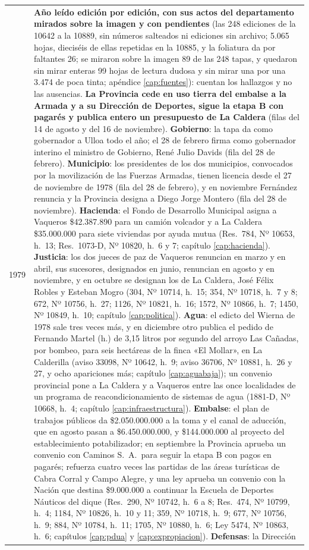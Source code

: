 \begin{longtable}{@{}p{2.7cm}p{10.3cm}@{}}
1979 & \textbf{Año leído edición por edición, con sus actos del departamento mirados sobre la imagen y con pendientes} (las 248 ediciones de la 10642 a la 10889, sin números salteados ni ediciones sin archivo; 5.065 hojas, dieciséis de ellas repetidas en la 10885, y la foliatura da por faltantes 26; se miraron sobre la imagen 89 de las 248 tapas, y quedaron sin mirar enteras 99 hojas de lectura dudosa y sin mirar una por una 3.474 de poca tinta; apéndice \ref{cap:fuentes}): cuentan los hallazgos y no las ausencias. \textbf{La Provincia cede en uso tierra del embalse a la Armada y a su Dirección de Deportes, sigue la etapa B con pagarés y publica entero un presupuesto de La Caldera} (filas del 14 de agosto y del 16 de noviembre). \textbf{Gobierno}: la tapa da como gobernador a Ulloa todo el año; el 28 de febrero firma como gobernador interino el ministro de Gobierno, René Julio Davids (fila del 28 de febrero). \textbf{Municipio}: los presidentes de los dos municipios, convocados por la movilización de las Fuerzas Armadas, tienen licencia desde el 27 de noviembre de 1978 (fila del 28 de febrero), y en noviembre Fernández renuncia y la Provincia designa a Diego Jorge Montero (fila del 28 de noviembre). \textbf{Hacienda}: el Fondo de Desarrollo Municipal asigna a Vaqueros \$42.387.890 para un camión volcador y a La Caldera \$35.000.000 para siete viviendas por ayuda mutua (Res.\ 784, Nº 10653, h.\ 13; Res.\ 1073-D, Nº 10820, h.\ 6 y 7; capítulo \ref{cap:hacienda}). \textbf{Justicia}: los dos jueces de paz de Vaqueros renuncian en marzo y en abril, sus sucesores, designados en junio, renuncian en agosto y en noviembre, y en octubre se designan los de La Caldera, José Félix Robles y Esteban Mogro (304, Nº 10714, h.\ 15; 354, Nº 10718, h.\ 7 y 8; 672, Nº 10756, h.\ 27; 1126, Nº 10821, h.\ 16; 1572, Nº 10866, h.\ 7; 1450, Nº 10849, h.\ 10; capítulo \ref{cap:politica}). \textbf{Agua}: el edicto del Wierna de 1978 sale tres veces más, y en diciembre otro publica el pedido de Fernando Martel (h.) de 3,15 litros por segundo del arroyo Las Cañadas, por bombeo, para seis hectáreas de la finca «El Mollar», en La Calderilla (aviso 33098, Nº 10642, h.\ 9; aviso 36706, Nº 10881, h.\ 26 y 27, y ocho apariciones más; capítulo \ref{cap:aguabaja}); un convenio provincial pone a La Caldera y a Vaqueros entre las once localidades de un programa de reacondicionamiento de sistemas de agua (1881-D, Nº 10668, h.\ 4; capítulo \ref{cap:infraestructura}). \textbf{Embalse}: el plan de trabajos públicos da \$2.050.000.000 a la toma y el canal de aducción, que en agosto pasan a \$6.450.000.000, y \$144.000.000 al proyecto del establecimiento potabilizador; en septiembre la Provincia aprueba un convenio con Caminos S.\ A.\ para seguir la etapa B con pagos en pagarés; refuerza cuatro veces las partidas de las áreas turísticas de Cabra Corral y Campo Alegre, y una ley aprueba un convenio con la Nación que destina \$9.000.000 a continuar la Escuela de Deportes Náuticos del dique (Res.\ 290, Nº 10742, h.\ 6 a 8; Res.\ 474, Nº 10799, h.\ 4; 1184, Nº 10826, h.\ 10 y 11; 359, Nº 10718, h.\ 9; 677, Nº 10756, h.\ 9; 884, Nº 10784, h.\ 11; 1705, Nº 10880, h.\ 6; Ley 5474, Nº 10863, h.\ 6; capítulos \ref{cap:pdua} y \ref{cap:expropiacion}). \textbf{Defensas}: la Dirección 
\end{longtable}
